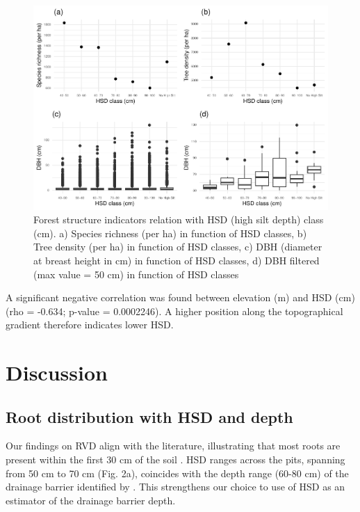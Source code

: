 \documentclass[fleqn,11pt]{latex/stylish_article} %
\begin{document}
\scriptsize

\begin{figure}

{\centering \includegraphics[width=0.8\linewidth,]{pedoP16-report_files/figure-latex/auger-1} 

}

\caption{Forest structure indicators relation with HSD (high silt depth) class (cm). a) Species richness (per ha) in function of HSD classes, b) Tree density (per ha) in function of HSD classes, c) DBH (diameter at breast height in cm) in function of HSD classes, d) DBH filtered (max value = 50 cm) in function of HSD classes}\label{fig:auger}
\end{figure}

\normalsize

A significant negative correlation was found between elevation (m) and HSD (cm) (rho = -0.634; p-value = 0.0002246). A higher position along the topographical gradient therefore indicates lower HSD.

\hypertarget{discussion}{%
\section{Discussion}\label{discussion}}

\hypertarget{root-distribution-with-hsd-and-depth}{%
\subsection{Root distribution with HSD and depth}\label{root-distribution-with-hsd-and-depth}}

Our findings on RVD align with the literature, illustrating that most roots are present within the first 30 cm of the soil \citep{freschetStartingGuideRoot2021, schenkGlobalBiogeographyRoots2002}. HSD ranges across the pits, spanning from 50 cm to 70 cm (Fig. 2a), coincides with the depth range (60-80 cm) of the drainage barrier identified by \citet{epronSpatialVariationSoil2006}. This strengthens our choice to use of HSD as an estimator of the drainage barrier depth.
\end{document}

